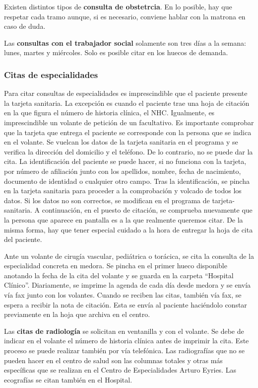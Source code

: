 Existen distintos tipos de \textbf{consulta de obstetrcia}.
En lo posible, hay que respetar cada tramo aunque, si es necesario, conviene hablar con la \gls{matrona} en caso de duda.

Las \textbf{consultas con el trabajador social} solamente son tres días a la semana: lunes, martes y miércoles.
Solo es posible citar en los huecos de demanda.

\subsubsection{Citas de especialidades}

Para citar consultas de especialidades es imprescindible que el paciente presente la tarjeta sanitaria.
La excepción es cuando el paciente trae una hoja de citación en la que figura el número de historia clínica, el NHC.
Igualmente, es imprescindible un \gls{volante} de petición de un facultativo.
Es importante comprobar que la tarjeta que entrega el paciente se corresponde con la persona que se indica en el \gls{volante}.
Se vuelcan los datos de la tarjeta sanitaria en el programa y se verifica la dirección del domicilio y el teléfono. De lo contrario, no se puede dar la cita.
La identificación del paciente se puede hacer, si no funciona con la tarjeta, por número de afiliación junto con los apellidos, nombre, fecha de nacimiento, documento de identidad o cualquier otro campo.
Tras la identificación, se pincha en la tarjeta sanitaria para proceder a la comprobación y volcado de todos los datos.
Si los datos no son correctos, se modifican en el programa de \Gls{tarjeta-sanitaria}.
A continuación, en el puesto de citación, se comprueba nuevamente que la persona que aparece en pantalla es a la que realmente queremos citar.
De la misma forma, hay que tener especial cuidado a la hora de entregar la hoja de cita del paciente.

Ante un \gls{volante} de cirugía vascular, pediátrica o torácica, se cita la consulta de la especialidad concreta en \Gls{medora}.
Se pincha en el primer hueco disponible anotando la fecha de la cita del \gls{volante} y se guarda en la carpeta ``Hospital Clínico''.
Diariamente, se imprime la agenda de cada día desde \Gls{medora} y se envía vía fax junto con los volantes.
Cuando se reciben las citas, también vía fax, se espera a recibir la nota de citación.
Esta se envía al paciente haciéndolo constar previamente en la hoja que archiva en el centro.

Las \textbf{citas de radiología} se solicitan en ventanilla y con el \gls{volante}.
Se debe de indicar en el \gls{volante} el número de historia clínica antes de imprimir la cita.
Este proceso se puede realizar también por vía telefónica.
Las radiografías que no se pueden hacer en el centro de salud son las columnas totales y otras más específicas que se realizan en el Centro de Especialidades Arturo Eyries.
Las ecografías se citan también en el Hospital.

